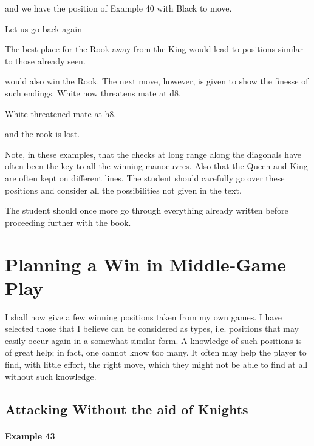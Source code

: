 \documentclass[11pt,a4paper]{book}
\begin{document}
 and we have the position of Example 40 with Black to move.

Let us go back again

\newgame
{}

 The best place for the Rook away from the King  would lead to positions similar to those already seen.

  would also win the Rook. The next move, however, is given to show the finesse of such endings. White now threatens mate at d8.

 White threatened mate at h8.

 and the rook is lost.

Note, in these examples, that the checks at long range along the diagonals have often been the key to all the winning manoeuvres. Also that the Queen and King are often kept on different lines. The student should carefully go over these positions and consider all the possibilities not given in the text.

The student should once more go through everything already written before proceeding further with the book.

\chapter{Planning a Win in Middle-Game Play}

I shall now give a few winning positions taken from my own games. I have selected those that I believe can be considered as types, i.e. positions that may easily occur again in a somewhat similar form. A knowledge of such positions is of great help; in fact, one cannot know too many. It often may help the player to find, with little effort, the right move, which they might not be able to find at all without such knowledge.

\section{Attacking Without the aid of Knights}

\subsubsection{Example 43}
\end{document}
